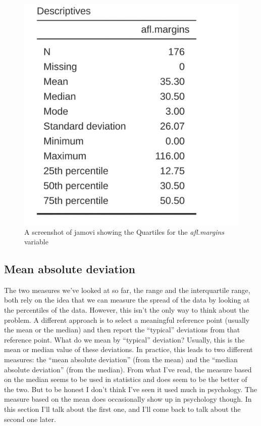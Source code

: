 \documentclass[
  a4paper,
]{book}
\begin{document}
\begin{figure}

\includegraphics[width=1\textwidth,height=\textheight]{images/fig4-8.png} \hfill{}

\caption{\label{fig-fig4-8}A screenshot of jamovi showing the Quartiles
for the \emph{afl.margins} variable}

\end{figure}

\hypertarget{mean-absolute-deviation}{%
\subsection{Mean absolute deviation}\label{mean-absolute-deviation}}

The two measures we've looked at so far, the range and the interquartile
range, both rely on the idea that we can measure the spread of the data
by looking at the percentiles of the data. However, this isn't the only
way to think about the problem. A different approach is to select a
meaningful reference point (usually the mean or the median) and then
report the ``typical'' deviations from that reference point. What do we
mean by ``typical'' deviation? Usually, this is the mean or median value
of these deviations. In practice, this leads to two different measures:
the ``mean absolute deviation'' (from the mean) and the ``median
absolute deviation'' (from the median). From what I've read, the measure
based on the median seems to be used in statistics and does seem to be
the better of the two. But to be honest I don't think I've seen it used
much in psychology. The measure based on the mean does occasionally show
up in psychology though. In this section I'll talk about the first one,
and I'll come back to talk about the second one later.
\end{document}
